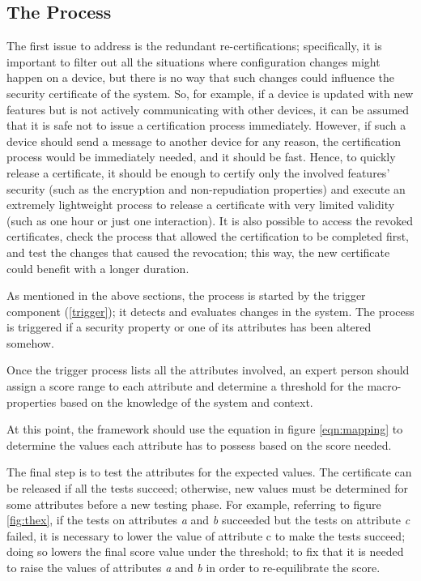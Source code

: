 \subsection{The Process}
The first issue to address is the redundant re-certifications; specifically, it is important to filter out all the situations where configuration changes might happen on a device, but there is no way that such changes could influence the security certificate of the system. So, for example, if a device is updated with new features but is not actively communicating with other devices, it can be assumed that it is safe not to issue a certification process immediately. However, if such a device should send a message to another device for any reason, the certification process would be immediately needed, and it should be fast. Hence, to quickly release a certificate, it should be enough to certify only the involved features' security (such as the encryption and non-repudiation properties) and execute an extremely lightweight process to release a certificate with very limited validity (such as one hour or just one interaction). It is also possible to access the revoked certificates, check the process that allowed the certification to be completed first, and test the changes that caused the revocation; this way, the new certificate could benefit with a longer duration. 

As mentioned in the above sections, the process is started by the trigger component (\ref{trigger}); it detects and evaluates changes in the system. The process is triggered if a security property or one of its attributes has been altered somehow. 

Once the trigger process lists all the attributes involved, an expert person should assign a score range to each attribute and determine a threshold for the macro-properties based on the knowledge of the system and context.

At this point, the framework should use the equation in figure \ref{eqn:mapping} to determine the values each attribute has to possess based on the score needed. 

The final step is to test the attributes for the expected values. The certificate can be released if all the tests succeed; otherwise, new values must be determined for some attributes before a new testing phase. 
For example, referring to figure \ref{fig:thex}, if the tests on attributes \textit{a} and \textit{b} succeeded but the tests on attribute \textit{c} failed, it is necessary to lower the value of attribute c to make the tests succeed; doing so lowers the final score value under the threshold; to fix that it is needed to raise the values of attributes \textit{a} and \textit{b} in order to re-equilibrate the score.

